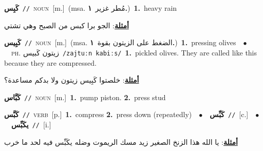 \documentclass[10pt,a4paper,twoside]{article} %
\begin{document}
\begin{multicols}{2}
{\setlength\topsep{0pt}\textbf{\foreignlanguage{arabic}{كَبِس}}\ {\color{gray}\texttt{//}\color{black}}\ \textsc{noun}\ [m.]\ \color{gray}(msa. \foreignlanguage{arabic}{مُطر غزير}~\foreignlanguage{arabic}{\textbf{١.}})\color{black}\ \textbf{1.}~heavy rain\  \begin{flushright}\color{gray}\foreignlanguage{arabic}{\textbf{\underline{\foreignlanguage{arabic}{أمثلة}}}: الجو برا كبس من الصبح وهي تشتي}\end{flushright}\color{black}} \vspace{2mm}

{\setlength\topsep{0pt}\textbf{\foreignlanguage{arabic}{كَبِيس}}\ {\color{gray}\texttt{//}\color{black}}\ \textsc{noun}\ [m.]\ \color{gray}(msa. \foreignlanguage{arabic}{الضغط على الزيتون بقوة}~\foreignlanguage{arabic}{\textbf{١.}})\color{black}\ \textbf{1.}~pressing olives\ \ $\bullet$\ \ \textsc{ph.} \color{gray} \foreignlanguage{arabic}{زيتون كَبيس}\color{black}\ {\color{gray}\texttt{/{\sffamily zajtuːn kabiːs}/}\color{black}}\ \textbf{1.}~pickled olives. They are called like this because they are compressed.\  \begin{flushright}\color{gray}\foreignlanguage{arabic}{\textbf{\underline{\foreignlanguage{arabic}{أمثلة}}}: خلصتوا كَبِيس زيتون ولا بدكم مساعدة؟}\end{flushright}\color{black}} \vspace{2mm}

{\setlength\topsep{0pt}\textbf{\foreignlanguage{arabic}{كَبَّاس}}\ {\color{gray}\texttt{//}\color{black}}\ \textsc{noun}\ [m.]\ \textbf{1.}~pump piston.  \textbf{2.}~press stud\ } \vspace{2mm}

{\setlength\topsep{0pt}\textbf{\foreignlanguage{arabic}{كَبَّس}}\ {\color{gray}\texttt{//}\color{black}}\ \textsc{verb}\ [p.]\ \textbf{1.}~compress  \textbf{2.}~press down (repeatedly)\ \ $\bullet$\ \ \setlength\topsep{0pt}\textbf{\foreignlanguage{arabic}{كَبِّس}}\ {\color{gray}\texttt{//}\color{black}}\ [c.]\ \ $\bullet$\ \ \setlength\topsep{0pt}\textbf{\foreignlanguage{arabic}{يكَبِّس}}\ {\color{gray}\texttt{//}\color{black}}\ [i.]\  \begin{flushright}\color{gray}\foreignlanguage{arabic}{\textbf{\underline{\foreignlanguage{arabic}{أمثلة}}}: يا الله هذا الزنخ الصغير زيد مسك الريموت وضله يكَبِّس فيه لحد ما خرب}\end{flushright}\color{black}} \vspace{2mm}


\end{multicols}
\end{document}
